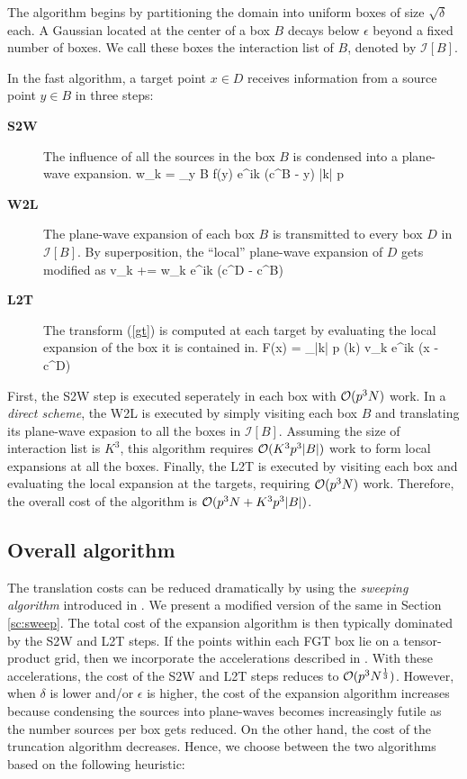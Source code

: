 The algorithm begins by partitioning the domain into uniform boxes of size $\sqrt{\delta}$ each. A Gaussian located at the center of a box $B$ decays below $\epsilon$ beyond a fixed number of boxes. We call these boxes the interaction list of $B$, denoted by $\mathcal{I}[B]$. 

In the fast algorithm, a target point $x \in D$ receives information from a source point $y \in B$ in three steps:
\begin{description}
\item[\textbf{S2W}] The influence of all the sources in the box $B$ is condensed into a plane-wave expansion.
            \beq w_k = \sum_{y \in B} f(y) e^{i\lambda k \cdot (c^B - y)} \quad \forall\quad |k| \leq p  \label{eqn:s2w} \eeq
            
\item[\textbf{W2L}] The plane-wave expansion of each box $B$ is transmitted to every box $D$ in $\mathcal{I}[B]$. By
 superposition, the ``local'' plane-wave expansion of $D$ gets modified as
            \beq v_k += w_k e^{i\lambda k \cdot (c^D - c^B)} \label{e:w2l}\eeq
            
\item[\textbf{L2T}] The transform (\ref{gt}) is computed at each target by evaluating the local expansion of the 
box it is contained in.
            \beq F(x) = \sum_{|k| \leq p} (k) v_k e^{i\lambda k \cdot (x - c^D)} \label{eqn:l2t}\eeq
\end{description} 

First, the S2W step is executed seperately in each box with $\mathcal{O}(p^3 N)$ work. In a {\em direct scheme}, 
the W2L is executed by simply visiting each box $B$ and translating its plane-wave expasion to all the boxes
 in $\mathcal{I}[B]$. Assuming the size of interaction list is $K^3$, this algorithm requires $\mathcal{O}(K^3 p^3 |B|)$ work 
 to form local expansions at all the boxes. Finally, the L2T is executed by visiting each box and evaluating the 
 local expansion at the targets, requiring $\mathcal{O}(p^3 N)$ work. Therefore, the overall cost of the algorithm is $\mathcal{O}(p^3 N + K^3 p^3 |B|)$.  

\subsection{Overall algorithm} 
The translation costs can be reduced dramatically by using the {\em sweeping algorithm} introduced in \cite{greengard98}. We present a 
modified version of the same in Section \ref{sc:sweep}. The total cost of the expansion algorithm is then typically dominated by the S2W
 and L2T steps. If the points within each FGT box lie on a tensor-product grid, then we incorporate the accelerations described in \cite{fggt}. With these
 accelerations, the cost of the S2W and L2T steps reduces to $\mathcal{O}(p^3 N^{\frac{1}{3}})$.
 However, when $\delta$ is lower and/or $\epsilon$ is higher, the cost of the expansion algorithm increases because 
 condensing the sources into plane-waves becomes increasingly futile as the number sources per box gets reduced. On the other hand, the
 cost of the truncation algorithm decreases. Hence, we choose between the two algorithms based on the following heuristic:

